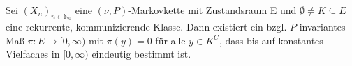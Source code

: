 Sei $(X_{n})_{n \in \mathbb{N}_{0}}$ eine $(\nu,P)$-Markovkette mit Zustandsraum E und $\emptyset \neq K \subseteq E$ eine rekurrente, kommunizierende Klasse. Dann existiert ein bzgl. $P$ invariantes Maß $\pi: E \to [0,\infty)$ mit $\pi(y) = 0$ für alle $y \in K^{C}$, dass bis auf konstantes Vielfaches in $[0,\infty)$ eindeutig bestimmt ist.